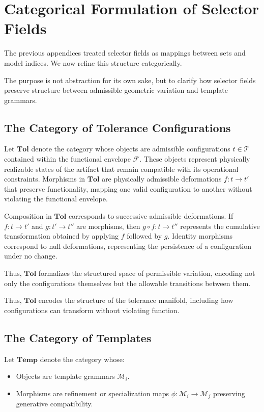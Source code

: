 \documentclass[11pt]{article}
\begin{document}
\section{Categorical Formulation of Selector Fields}

The previous appendices treated selector fields as mappings
between sets and model indices. We now refine this structure
categorically.

The purpose is not abstraction for its own sake,
but to clarify how selector fields preserve structure
between admissible geometric variation and template grammars.

\subsection{The Category of Tolerance Configurations}

Let $\mathbf{Tol}$ denote the category whose objects are admissible
configurations $t \in \mathcal{T}$ contained within the functional
envelope $\mathcal{F}$. These objects represent physically realizable
states of the artifact that remain compatible with its operational
constraints. Morphisms in $\mathbf{Tol}$ are physically admissible
deformations $f : t \to t'$ that preserve functionality, mapping one
valid configuration to another without violating the functional
envelope.

Composition in $\mathbf{Tol}$ corresponds to successive admissible
deformations. If $f : t \to t'$ and $g : t' \to t''$ are morphisms,
then $g \circ f : t \to t''$ represents the cumulative transformation
obtained by applying $f$ followed by $g$. Identity morphisms correspond
to null deformations, representing the persistence of a configuration
under no change.

Thus, $\mathbf{Tol}$ formalizes the structured space of permissible
variation, encoding not only the configurations themselves but the
allowable transitions between them.

Thus, $\mathbf{Tol}$ encodes the structure of the tolerance manifold,
including how configurations can transform without violating function.

\subsection{The Category of Templates}

Let $\mathbf{Temp}$ denote the category whose:

\begin{itemize}
\item Objects are template grammars $\mathcal{M}_i$.
\item Morphisms are refinement or specialization maps
      $\phi : \mathcal{M}_i \to \mathcal{M}_j$
      preserving generative compatibility.
\end{itemize}
\end{document}
